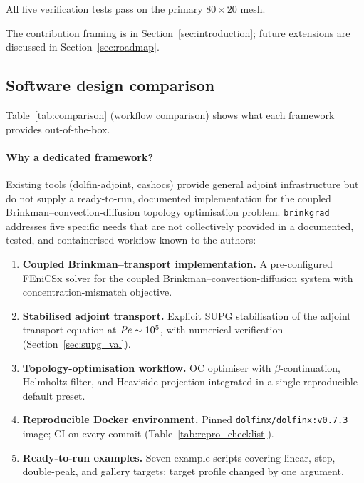 All five verification tests pass on the primary $80\times20$ mesh.


The contribution framing is in Section~\ref{sec:introduction};
future extensions are discussed in Section~\ref{sec:roadmap}.


\subsection{Software design comparison}
\label{sec:sw_comparison}

Table~\ref{tab:comparison} (workflow comparison)
shows what each framework provides out-of-the-box.

\paragraph{Why a dedicated framework?}
Existing tools (dolfin-adjoint, cashocs) provide general adjoint
infrastructure but do not supply a ready-to-run, documented
implementation for the coupled Brinkman--convection-diffusion
topology optimisation problem.
\texttt{brinkgrad} addresses five specific needs that are
not collectively provided in a documented, tested,
and containerised workflow known to the authors:
\begin{enumerate}\itemsep2pt
    \item \textbf{Coupled Brinkman--transport implementation.}
          A pre-configured FEniCSx solver for the coupled
          Brinkman--convection-diffusion system with
          concentration-mismatch objective.
    \item \textbf{Stabilised adjoint transport.}
          Explicit SUPG stabilisation of the adjoint
          transport equation at $\mathit{Pe}\sim10^5$,
          with numerical verification (Section~\ref{sec:supg_val}).
    \item \textbf{Topology-optimisation workflow.}
          OC optimiser with $\beta$-continuation,
          Helmholtz filter, and Heaviside projection
          integrated in a single reproducible default preset.
    \item \textbf{Reproducible Docker environment.}
          Pinned \texttt{dolfinx/dolfinx:v0.7.3} image;
          CI on every commit (Table~\ref{tab:repro_checklist}).
    \item \textbf{Ready-to-run examples.}
          Seven example scripts covering linear, step,
          double-peak, and gallery targets;
          target profile changed by one argument.
\end{enumerate}

